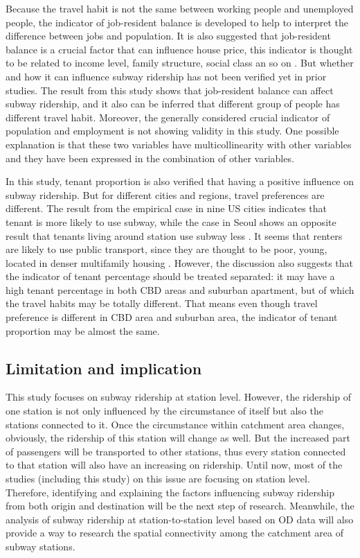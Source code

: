 %
Because the travel habit is not the same between working people and unemployed people, the indicator of job-resident balance is developed to help to interpret the difference between jobs and population. It is also suggested that job-resident balance is a crucial factor that can influence house price, this indicator is thought to be related to income level, family structure, social class an so on \cite{song2004measuring}. But whether and how it can influence subway ridership has not been verified yet in prior studies. The result from this study shows that job-resident balance can affect subway ridership, and it also can be inferred that different group of people has different travel habit. Moreover, the generally considered crucial indicator of population and employment is not showing validity in this study. One possible explanation is that these two variables have multicollinearity with other variables and they have been expressed in the combination of other variables.

%
In this study, tenant proportion is also verified that having a positive influence on subway ridership. But for different cities and regions, travel preferences are different. The result from the empirical case in nine US cities indicates that tenant is more likely to use subway, while the case in Seoul shows an opposite result that tenants living around station use subway less \cite{jun2015land,kuby2004factors}. It seems that renters are likely to use public transport, since they are thought to be poor, young, located in denser multifamily housing \cite{kuby2004factors}. However, the discussion also suggests that the indicator of tenant percentage should be treated separated: it may have a high tenant percentage in both CBD areas and suburban apartment, but of which the travel habits may be totally different. That means even though travel preference is different in CBD area and suburban area, the indicator of tenant proportion may be almost the same.

%
\subsection{Limitation and implication}
%
This study focuses on subway ridership at station level. However, the ridership of one station is not only influenced by the circumstance of itself but also the stations connected to it. Once the circumstance within catchment area changes, obviously, the ridership of this station will change as well. But the increased part of passengers will be transported to other stations, thus every station connected to that station will also have an increasing on ridership. Until now, most of the studies (including this study) on this issue are focusing on station level. Therefore, identifying and explaining the factors influencing subway ridership from both origin and destination will be the next step of research. Meanwhile, the analysis of subway ridership at station-to-station level based on OD data will also provide a way to research the spatial connectivity among the catchment area of subway stations.


